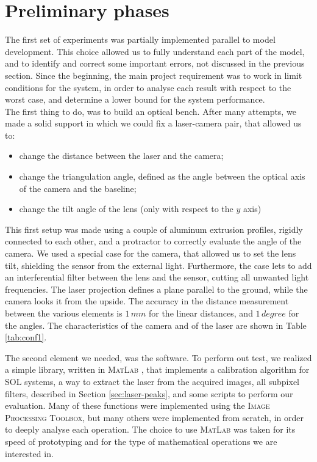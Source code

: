 \section{Preliminary phases}
The first set of experiments was partially implemented parallel to model development. This choice allowed us to fully understand each part of the model, and to identify and correct some important errors, not discussed in the previous section. Since the beginning, the main project requirement was to work in limit conditions for the system, in order to analyse each result with respect to the worst case, and determine a lower bound for the system performance. \\

The first thing to do, was to build an optical bench. After many attempts, we made a solid support in which we could fix a laser-camera pair, that allowed us to:
  \begin{itemize}
    \item change the distance between the laser and the camera;
    \item change the triangulation angle, defined as the angle between the optical axis of the camera and the baseline;
    \item change the tilt angle of the lens (only with respect to the $y$ axis)
  \end{itemize}
This first setup was made using a couple of aluminum extrusion profiles, rigidly connected to each other, and a protractor to correctly evaluate the angle of the camera. We used a special case for the camera, that allowed us to set the lens tilt, shielding the sensor from the external light. Furthermore, the case lets to add an interferential filter between the lens and the sensor, cutting all unwanted light frequencies. The laser projection defines a plane parallel to the ground, while the camera looks it from the upside. The accuracy in the distance measurement between the various elements is $1 \, mm$ for the linear distances, and $1 \, degree$ for the angles. The characteristics of the camera and of the laser are shown in Table \ref{tab:conf1}.
  

\noindent
The second element we needed, was the software. To perform out test, we realized a simple library, written in \textsc{MatLab} \cite{MATLAB:2017}, that implements a calibration algorithm for \acs{SOL} systems, a way to extract the laser from the acquired images, all subpixel filters, described in Section \ref{sec:laser-peaks}, and some scripts to perform our evaluation. Many of these functions were implemented using the \textsc{Image Processing Toolbox}, but many others were implemented from scratch, in order to deeply analyse each operation. The choice to use \textsc{MatLab} was taken for its speed of prototyping and for the type of mathematical operations we are interested in. \\

